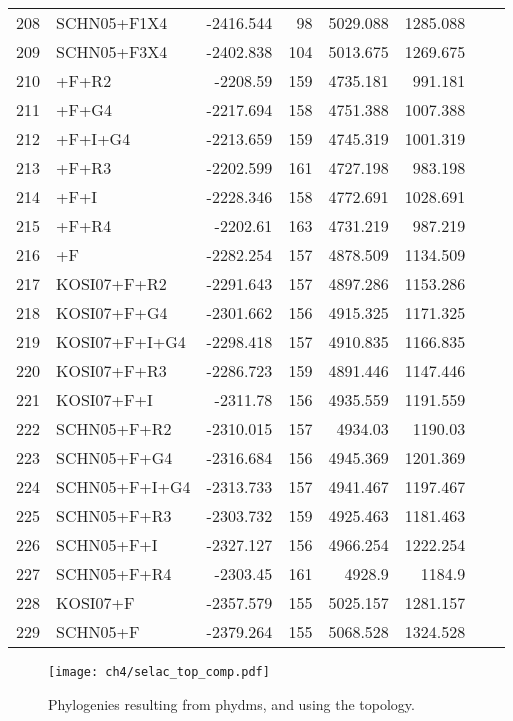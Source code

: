 \begin{longtable}{clrrrrrr}
	208 & SCHN05+F1X4 & -2416.544 & 98 & 5029.088 & 1285.088 \\ 
	209 & SCHN05+F3X4 & -2402.838 & 104 & 5013.675 & 1269.675 \\ 
	210 & \gy+F+R2 & -2208.59 & 159 & 4735.181 & 991.181 \\ 
	211 & \gy+F+G4 & -2217.694 & 158 & 4751.388 & 1007.388 \\ 
	212 & \gy+F+I+G4 & -2213.659 & 159 & 4745.319 & 1001.319 \\ 
	213 & \gy+F+R3 & -2202.599 & 161 & 4727.198 & 983.198 \\ 
	214 & \gy+F+I & -2228.346 & 158 & 4772.691 & 1028.691 \\ 
	215 & \gy+F+R4 & -2202.61 & 163 & 4731.219 & 987.219 \\ 
	216 & \gy+F & -2282.254 & 157 & 4878.509 & 1134.509 \\ 
	217 & KOSI07+F+R2 & -2291.643 & 157 & 4897.286 & 1153.286 \\ 
	218 & KOSI07+F+G4 & -2301.662 & 156 & 4915.325 & 1171.325 \\ 
	219 & KOSI07+F+I+G4 & -2298.418 & 157 & 4910.835 & 1166.835 \\ 
	220 & KOSI07+F+R3 & -2286.723 & 159 & 4891.446 & 1147.446 \\ 
	221 & KOSI07+F+I & -2311.78 & 156 & 4935.559 & 1191.559 \\ 
	222 & SCHN05+F+R2 & -2310.015 & 157 & 4934.03 & 1190.03 \\ 
	223 & SCHN05+F+G4 & -2316.684 & 156 & 4945.369 & 1201.369 \\ 
	224 & SCHN05+F+I+G4 & -2313.733 & 157 & 4941.467 & 1197.467 \\ 
	225 & SCHN05+F+R3 & -2303.732 & 159 & 4925.463 & 1181.463 \\ 
	226 & SCHN05+F+I & -2327.127 & 156 & 4966.254 & 1222.254 \\ 
	227 & SCHN05+F+R4 & -2303.45 & 161 & 4928.9 & 1184.9 \\ 
	228 & KOSI07+F & -2357.579 & 155 & 5025.157 & 1281.157 \\ 
	229 & SCHN05+F & -2379.264 & 155 & 5068.528 & 1324.528  \\
\end{longtable}

\clearpage

\singlespacing
\begin{figure}[H]
     \centering
	\texttt{[image: ch4/selac\_top\_comp.pdf]}
	\caption{Phylogenies resulting from phydms, and \selac using the \phydms topology.}
	\label{fig:phylo_comp}
\end{figure}
\doublespacing
